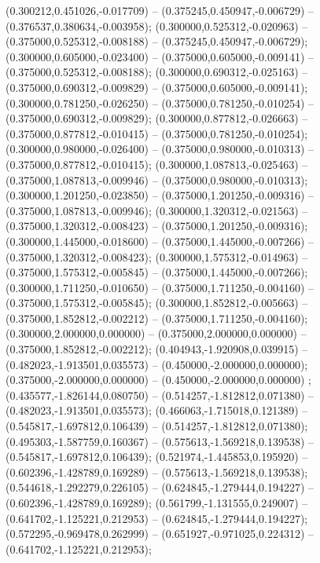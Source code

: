  (0.300212,0.451026,-0.017709) -- (0.375245,0.450947,-0.006729) -- (0.376537,0.380634,-0.003958);
 (0.300000,0.525312,-0.020963) -- (0.375000,0.525312,-0.008188) -- (0.375245,0.450947,-0.006729);
 (0.300000,0.605000,-0.023400) -- (0.375000,0.605000,-0.009141) -- (0.375000,0.525312,-0.008188);
 (0.300000,0.690312,-0.025163) -- (0.375000,0.690312,-0.009829) -- (0.375000,0.605000,-0.009141);
 (0.300000,0.781250,-0.026250) -- (0.375000,0.781250,-0.010254) -- (0.375000,0.690312,-0.009829);
 (0.300000,0.877812,-0.026663) -- (0.375000,0.877812,-0.010415) -- (0.375000,0.781250,-0.010254);
 (0.300000,0.980000,-0.026400) -- (0.375000,0.980000,-0.010313) -- (0.375000,0.877812,-0.010415);
 (0.300000,1.087813,-0.025463) -- (0.375000,1.087813,-0.009946) -- (0.375000,0.980000,-0.010313);
 (0.300000,1.201250,-0.023850) -- (0.375000,1.201250,-0.009316) -- (0.375000,1.087813,-0.009946);
 (0.300000,1.320312,-0.021563) -- (0.375000,1.320312,-0.008423) -- (0.375000,1.201250,-0.009316);
 (0.300000,1.445000,-0.018600) -- (0.375000,1.445000,-0.007266) -- (0.375000,1.320312,-0.008423);
 (0.300000,1.575312,-0.014963) -- (0.375000,1.575312,-0.005845) -- (0.375000,1.445000,-0.007266);
 (0.300000,1.711250,-0.010650) -- (0.375000,1.711250,-0.004160) -- (0.375000,1.575312,-0.005845);
 (0.300000,1.852812,-0.005663) -- (0.375000,1.852812,-0.002212) -- (0.375000,1.711250,-0.004160);
 (0.300000,2.000000,0.000000) -- (0.375000,2.000000,0.000000) -- (0.375000,1.852812,-0.002212);
 (0.404943,-1.920908,0.039915) -- (0.482023,-1.913501,0.035573) -- (0.450000,-2.000000,0.000000);
 (0.375000,-2.000000,0.000000) -- (0.450000,-2.000000,0.000000) ;
 (0.435577,-1.826144,0.080750) -- (0.514257,-1.812812,0.071380) -- (0.482023,-1.913501,0.035573);
 (0.466063,-1.715018,0.121389) -- (0.545817,-1.697812,0.106439) -- (0.514257,-1.812812,0.071380);
 (0.495303,-1.587759,0.160367) -- (0.575613,-1.569218,0.139538) -- (0.545817,-1.697812,0.106439);
 (0.521974,-1.445853,0.195920) -- (0.602396,-1.428789,0.169289) -- (0.575613,-1.569218,0.139538);
 (0.544618,-1.292279,0.226105) -- (0.624845,-1.279444,0.194227) -- (0.602396,-1.428789,0.169289);
 (0.561799,-1.131555,0.249007) -- (0.641702,-1.125221,0.212953) -- (0.624845,-1.279444,0.194227);
 (0.572295,-0.969478,0.262999) -- (0.651927,-0.971025,0.224312) -- (0.641702,-1.125221,0.212953);
